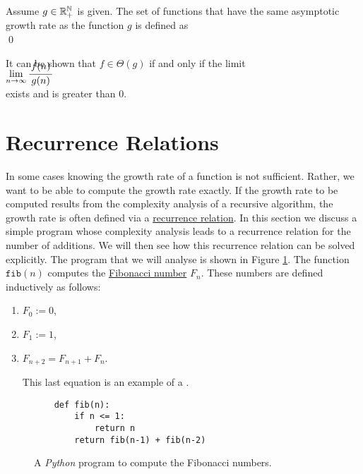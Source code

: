 \begin{Definition}[$\Theta(g)$] 
  Assume $g \in {\mathbb R}_+^{{\mathbb N}}$ is given.   The set of functions that have the same asymptotic growth rate
  as the function $g$ is defined as
  \\[0.2cm]
  \hspace*{0.5cm} 
  \colorbox{red}{}
  \qed 
\end{Definition}

\noindent
It can be shown that $f \in \Theta(g)$ if and only if the limit
\\[0.4cm]
\hspace*{1.3cm}
$\lim\limits_{n \rightarrow \infty} \bruch{f(n)}{g(n)}$
\\[0.2cm]
exists and is greater than $0$.

\section{Recurrence Relations}
In some cases knowing the growth rate of a function is not sufficient.  Rather, we want to be able to compute
the growth rate exactly.  If the growth rate to be computed results from the complexity analysis of a recursive
algorithm, the growth rate is often defined via a \href{https://en.wikipedia.org/wiki/Recurrence_relation}{recurrence relation}.
In this section we discuss a simple program whose complexity analysis leads to a recurrence relation for the 
number of additions.  We will then see how this recurrence relation can be solved explicitly.  The program that
we will analyse is shown in Figure \ref{fig:Fibonacci.ipynb}.  The function $\texttt{fib}(n)$ computes the
\href{https://en.wikipedia.org/wiki/Fibonacci_number}{Fibonacci number}  $F_n$.  These
numbers are defined inductively as follows:
\begin{enumerate}
\item $F_0 := 0$,
\item $F_1 := 1$, 
\item $F_{n+2} = F_{n+1} + F_n$.

      This last equation is an example of a .
\end{enumerate}

\begin{figure}[!h]
  \centering
\begin{verbatim}
    def fib(n):
        if n <= 1:
            return n
        return fib(n-1) + fib(n-2)
\end{verbatim}
\vspace*{-0.3cm}
  \caption{A \textsl{Python} program to compute the Fibonacci numbers.}
  \label{fig:Fibonacci.ipynb}
\end{figure} 

